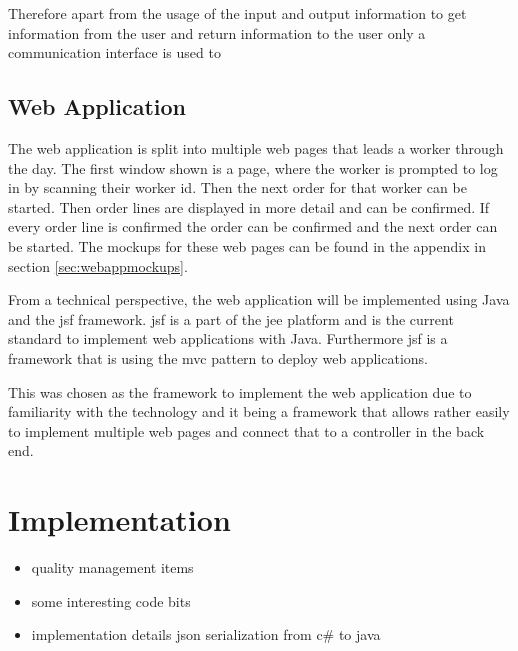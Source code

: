 Therefore apart from the usage of the input and output information to get information from the user and return information to the user only a communication interface is used to 

\subsection{Web Application}
The web application is split into multiple web pages that leads a worker through the day. The first window shown is a page, where the worker is prompted to log in by scanning their worker id. Then the next order for that worker can be started. Then order lines are displayed in more detail and can be confirmed. If every order line is confirmed the order can be confirmed and the next order can be started. The mockups for these web pages can be found in the appendix in section \ref{sec:webappmockups}.

From a technical perspective, the web application will be implemented using Java and the \gls{jsf} framework. \gls{jsf} is a part of the \gls{jee} platform and is the current standard to implement web applications with Java. Furthermore \gls{jsf} is a framework that is using the \gls{mvc} pattern to deploy web applications. 

This was chosen as the framework to implement the web application due to familiarity with the technology and it being a framework that allows rather easily to implement multiple web pages and connect that to a controller in the back end.

\section{Implementation}
\begin{itemize}
	\item quality management items
	\item some interesting code bits
	\item implementation details json serialization from c\# to java
	
\end{itemize}